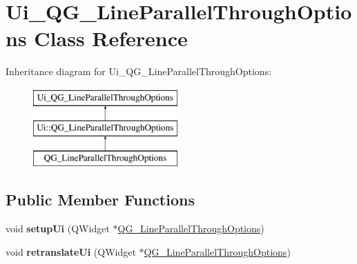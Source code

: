 \hypertarget{classUi__QG__LineParallelThroughOptions}{\section{Ui\-\_\-\-Q\-G\-\_\-\-Line\-Parallel\-Through\-Options Class Reference}
\label{classUi__QG__LineParallelThroughOptions}
}
Inheritance diagram for Ui\-\_\-\-Q\-G\-\_\-\-Line\-Parallel\-Through\-Options\-:\begin{figure}[H]
\begin{center}
\leavevmode
\includegraphics[height=3.000000cm]{classUi__QG__LineParallelThroughOptions}
\end{center}
\end{figure}
\subsection*{Public Member Functions}
\begin{DoxyCompactItemize}
\item 
\hypertarget{classUi__QG__LineParallelThroughOptions_a8d3afc91cf12e0aabfa0b155bf5edbde}{void {\bfseries setup\-Ui} (Q\-Widget $\ast$\hyperlink{classQG__LineParallelThroughOptions}{Q\-G\-\_\-\-Line\-Parallel\-Through\-Options})}\label{classUi__QG__LineParallelThroughOptions_a8d3afc91cf12e0aabfa0b155bf5edbde}

\item 
\hypertarget{classUi__QG__LineParallelThroughOptions_a99fc6b2aaeac45184c8fe941ac76cd29}{void {\bfseries retranslate\-Ui} (Q\-Widget $\ast$\hyperlink{classQG__LineParallelThroughOptions}{Q\-G\-\_\-\-Line\-Parallel\-Through\-Options})}\label{classUi__QG__LineParallelThroughOptions_a99fc6b2aaeac45184c8fe941ac76cd29}

\end{DoxyCompactItemize}
